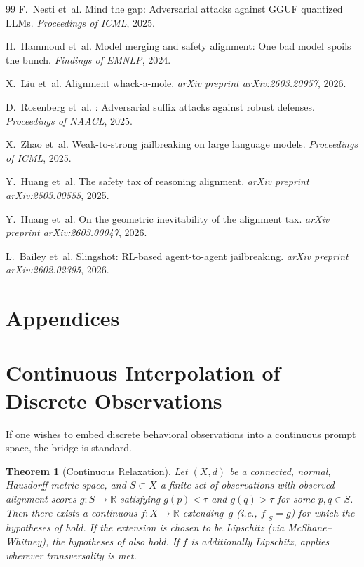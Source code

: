 \documentclass[11pt]{article}
\newtheorem{theorem}{Theorem}[section]
\newcommand{\R}{\mathbb{R}}
\begin{document}
\begin{thebibliography}{99}
F.~Nesti et~al.
\newblock Mind the gap: Adversarial attacks against {GGUF} quantized
  {LLMs}.
\newblock \emph{Proceedings of ICML}, 2025.

H.~Hammoud et~al.
\newblock Model merging and safety alignment: One bad model spoils the
  bunch.
\newblock \emph{Findings of EMNLP}, 2024.

X.~Liu et~al.
\newblock Alignment whack-a-mole.
\newblock \emph{arXiv preprint arXiv:2603.20957}, 2026.

D.~Rosenberg et~al.
: Adversarial suffix attacks against robust defenses.
\newblock \emph{Proceedings of NAACL}, 2025.

X.~Zhao et~al.
\newblock Weak-to-strong jailbreaking on large language models.
\newblock \emph{Proceedings of ICML}, 2025.

Y.~Huang et~al.
\newblock The safety tax of reasoning alignment.
\newblock \emph{arXiv preprint arXiv:2503.00555}, 2025.

Y.~Huang et~al.
\newblock On the geometric inevitability of the alignment tax.
\newblock \emph{arXiv preprint arXiv:2603.00047}, 2026.

L.~Bailey et~al.
\newblock Slingshot: {RL}-based agent-to-agent jailbreaking.
\newblock \emph{arXiv preprint arXiv:2602.02395}, 2026.

\end{thebibliography}


\newpage
\appendix
\section*{Appendices}

\section{Continuous Interpolation of Discrete Observations}
\label{app:continuous-relaxation}

If one wishes to embed discrete behavioral observations into a
continuous prompt space, the bridge is standard.

\begin{theorem}[Continuous Relaxation]
\label{thm:tietze}
Let $(X,d)$ be a connected, normal, Hausdorff metric space, and
$S \subset X$ a finite set of observations with observed alignment
scores $g\colon S \to \R$ satisfying $g(p) < \tau$ and $g(q) > \tau$
for some $p, q \in S$. Then there exists a continuous $f\colon X \to \R$
extending~$g$ (i.e., $f|_S = g$) for which the hypotheses of
 hold. If the extension is chosen to be Lipschitz
(via McShane--Whitney), the hypotheses of  also
hold. If $f$ is additionally Lipschitz,  applies
wherever transversality is met.
\end{theorem}
\end{document}
